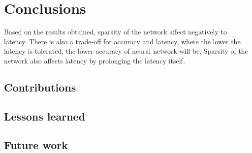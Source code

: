 

    \chapter{Conclusions}
    Based on the results obtained, sparsity of the network affect negatively to latency. There is also a trade-off for accuracy and latency, where the lower the latency is tolerated, the lower accuracy of neural network will be. Sparsity of the network also affects latency by prolonging the latency itself. 

    \section{Contributions}

    \section{Lessons learned}

    \section{Future work}

